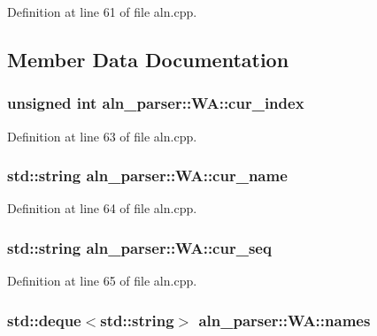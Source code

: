 Definition at line 61 of file aln.\+cpp.



\subsection{Member Data Documentation}
\hypertarget{structaln__parser_1_1_w_a_ae1cf2b0998aee4041e4f8cb695b11547}{
\subsubsection[{cur\+\_\+index}]{\setlength{\rightskip}{0pt plus 5cm}unsigned int aln\+\_\+parser\+::\+W\+A\+::cur\+\_\+index}}\label{structaln__parser_1_1_w_a_ae1cf2b0998aee4041e4f8cb695b11547}


Definition at line 63 of file aln.\+cpp.

\hypertarget{structaln__parser_1_1_w_a_a815e71b42f92a2e42d834c864dd49922}{
\subsubsection[{cur\+\_\+name}]{\setlength{\rightskip}{0pt plus 5cm}std\+::string aln\+\_\+parser\+::\+W\+A\+::cur\+\_\+name}}\label{structaln__parser_1_1_w_a_a815e71b42f92a2e42d834c864dd49922}


Definition at line 64 of file aln.\+cpp.

\hypertarget{structaln__parser_1_1_w_a_adb0f22840fc3398a742fc43cbcfb3d1a}{
\subsubsection[{cur\+\_\+seq}]{\setlength{\rightskip}{0pt plus 5cm}std\+::string aln\+\_\+parser\+::\+W\+A\+::cur\+\_\+seq}}\label{structaln__parser_1_1_w_a_adb0f22840fc3398a742fc43cbcfb3d1a}


Definition at line 65 of file aln.\+cpp.

\hypertarget{structaln__parser_1_1_w_a_a0fbe85211bc67c62db9861c69308e230}{
\subsubsection[{names}]{\setlength{\rightskip}{0pt plus 5cm}std\+::deque$<$std\+::string$>$ aln\+\_\+parser\+::\+W\+A\+::names}}\label{structaln__parser_1_1_w_a_a0fbe85211bc67c62db9861c69308e230}


